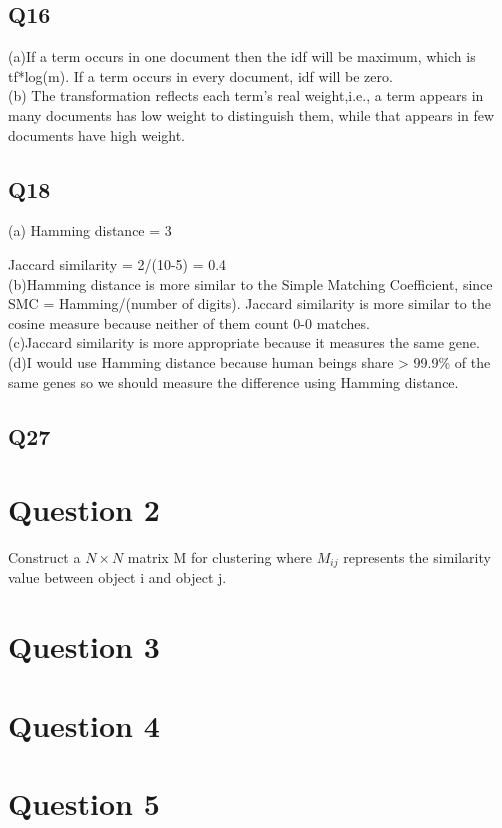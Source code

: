 \documentclass[a4paper]{article}
\begin{document}
\subsection{Q16}
(a)If a term occurs in one document then the idf will be maximum, which is tf*log(m). If a term occurs in every document, idf will be zero.
\\(b) The transformation reflects each term's real weight,i.e., a term appears in many documents has low weight to distinguish them, while that appears in few documents have high weight.
\subsection{Q18}
(a) Hamming distance = 3
\par Jaccard similarity = 2/(10-5) = 0.4
\\(b)Hamming distance is more similar to the Simple Matching Coefficient, since SMC = Hamming/(number of digits). Jaccard similarity is more similar to the cosine measure because neither of them count 0-0 matches.
\\(c)Jaccard similarity is more appropriate because it measures the same gene.
\\(d)I would use Hamming distance because human beings share > 99.9\% of the same genes so we should measure the difference using Hamming distance.
\subsection{Q27}

\section{Question 2}
Construct a $N \times N$ matrix M for clustering where $M_{ij}$ represents the similarity value between object i and object j.
\section{Question 3}

\section{Question 4}
\section{Question 5}
\end{document}
